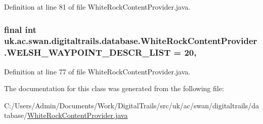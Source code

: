 Definition at line 81 of file White\+Rock\+Content\+Provider.\+java.

\hypertarget{classuk_1_1ac_1_1swan_1_1digitaltrails_1_1database_1_1_white_rock_content_provider_a3136aba0088be1e1d45c62211f44a0dc}{
\subsubsection[{W\+E\+L\+S\+H\+\_\+\+W\+A\+Y\+P\+O\+I\+N\+T\+\_\+\+D\+E\+S\+C\+R\+\_\+\+L\+I\+S\+T}]{\setlength{\rightskip}{0pt plus 5cm}final int uk.\+ac.\+swan.\+digitaltrails.\+database.\+White\+Rock\+Content\+Provider.\+W\+E\+L\+S\+H\+\_\+\+W\+A\+Y\+P\+O\+I\+N\+T\+\_\+\+D\+E\+S\+C\+R\+\_\+\+L\+I\+S\+T = 20\hspace{0.3cm}{\ttfamily [static]}, {\ttfamily [private]}}}\label{classuk_1_1ac_1_1swan_1_1digitaltrails_1_1database_1_1_white_rock_content_provider_a3136aba0088be1e1d45c62211f44a0dc}


Definition at line 77 of file White\+Rock\+Content\+Provider.\+java.



The documentation for this class was generated from the following file\+:\begin{DoxyCompactItemize}
\item 
C\+:/\+Users/\+Admin/\+Documents/\+Work/\+Digital\+Trails/src/uk/ac/swan/digitaltrails/database/\hyperlink{_white_rock_content_provider_8java}{White\+Rock\+Content\+Provider.\+java}\end{DoxyCompactItemize}
